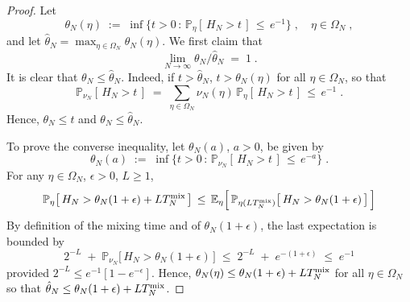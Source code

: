 \documentclass[reqno]{amsart}
\begin{document}
\begin{proof}
Let
\begin{equation*}
\theta_N(\eta) \;:=\; \inf\big\{ t>0 \,:\, {{\mathbb P}}_{\eta} [\,
  H_N > t\,] \,\le\, e^{-1} \big\}\;,\quad \eta\in \Omega_N\;,
\end{equation*}
and let $\hat \theta_N = \max_{\eta\in \Omega_N} \theta_N(\eta)$. We
first claim that
\begin{equation}
\label{04}
\lim_{N\to\infty} \theta_N/\hat\theta_N \;=\; 1\;.
\end{equation}
It is clear that $\theta_N \le \hat\theta_N$. Indeed, if
$t>\hat\theta_N$, $t>\theta_N(\eta)$ for all $\eta\in
\Omega_N$, so that
\begin{equation*}
{{\mathbb P}}_{\nu_N} [\,H_N > t \,] \;=\;
\sum_{\eta\in \Omega_N} \nu_N (\eta)\,
{{\mathbb P}}_{\eta} [\, H_N > t\,] \,\le\, e^{-1}\;.
\end{equation*}
Hence, $\theta_N \le t$ and $\theta_N \le \hat\theta_N$.

To prove the converse inequality, let $\theta_N(a)$, $a>0$, be given
by 
\begin{equation*}
\theta_N(a) \;:=\; \inf\big\{ t>0 \,:\, {{\mathbb P}}_{\nu_N} [\,
  H_N > t\,] \,\le\, e^{-a} \big\}\;. 
\end{equation*}
For any $\eta\in\Omega_N$, $\epsilon>0$, $L\ge 1$,
\begin{equation*}
{{\mathbb P}}_{\eta} \big[\, H_N > \theta_N(1+\epsilon) + L T^{\rm mix}_N\,\big]
\,\le\, {{\mathbb E}}_{\eta} \Big[\, 
{{\mathbb P}}_{\eta (L T^{\rm mix}_N)} \big[\, H_N > \theta_N(1+\epsilon) \,\big]
\,\Big]
\end{equation*} 
By definition of the mixing time and of $\theta_N(1+\epsilon)$, the
last expectation is bounded by
\begin{equation*}
2^{-L}\;+\; {{\mathbb P}}_{\nu_N} \big[\, H_N > 
\theta_N(1+\epsilon) \,\big] \;\le\; 2^{-L}\;+\;
e^{-(1+\epsilon)}\;\le\; e^{-1} 
\end{equation*}
provided $2^{-L} \le e^{-1} [ 1 - e^{-\epsilon}]$. Hence,
$\theta_N(\eta) \le \theta_N(1+\epsilon) + L T^{\rm mix}_N$ for all
$\eta\in\Omega_N$ so that $\hat \theta_N \le \theta_N(1+\epsilon) + L
T^{\rm mix}_N$.


\end{proof}
\end{document}
